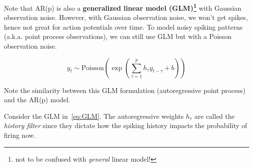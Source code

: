 \documentclass[a4paper,11pt]{exam}
\newcounter{homework}
\newcommand{\homework}{\stepcounter{homework}\textcolor{violet}{\textbf{Homework \thehomework:}~}}
\begin{document}
\begin{questions}

Note that AR(p) is also a \textbf{generalized linear model (GLM)\footnote{not to be confused with \emph{general} linear model!}} with Gaussian observation noise.
However, with Gaussian observation noise, we won't get spikes, hence not great for action potentials over time.
To model noisy spiking patterns (a.k.a. point process observations), we can still use GLM but with a Poisson observation noise.
\begin{tcolorbox}[colback=red!5!white,colframe=red!50!black,title=Autoregressive Point Process (a.k.a. Poisson-GLM)]
\noindent
\begin{equation}\label{eq:GLM}
    y_t \sim \text{Poisson}\left(\exp\left( \sum_{\tau=1}^p h_\tau y_{t-\tau} + b\right)\right)
\end{equation}
\end{tcolorbox}
Note the similarity between this GLM formulation (autoregressive point process) and the AR(p) model.

\question Consider the GLM in~\eqref{eq:GLM}.
The autoregressive weights $h_\tau$ are called the \emph{history filter} since they dictate how the spiking history impacts the probability of firing now.
\end{questions}
\end{document}
